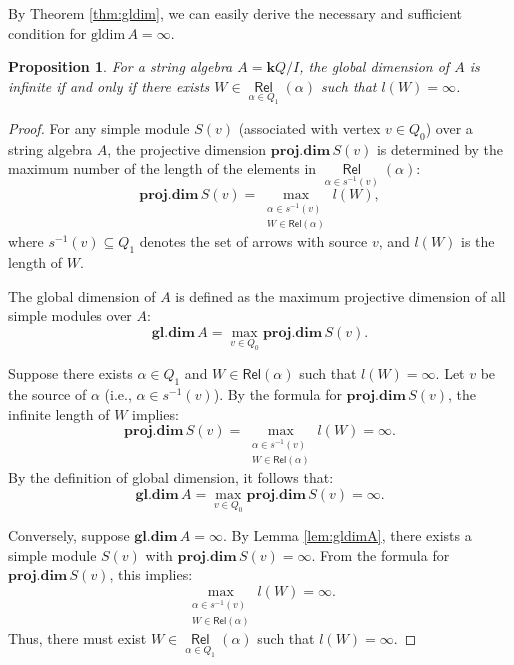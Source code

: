 \documentclass[11pt]{amsart}
\numberwithin{equation}{section}
\newtheorem{proposition}[theorem]{Proposition}
\theoremstyle{definition}
\begin{document}
By Theorem \ref{thm:gldim}, we can easily derive the necessary and sufficient condition for \( \text{gldim}\,A = \infty \).
\begin{proposition}\label{pro:gldim-infinite}
	For a string algebra \( A = \mathbf{k}Q/I \), the global dimension of \( A \) is infinite if and only if there exists \( W \in \mathop{\mathsf{Rel}}\limits_{\alpha \in Q_{1}} (\alpha) \) such that \( l(W) = \infty \).
\end{proposition}
\begin{proof}
	For any simple module \( S(v) \) (associated with vertex \( v \in Q_0 \)) over a string algebra \( A \), the projective dimension \( \textbf{proj.dim}\,S(v) \) is determined by the maximum number of the length of the elements in \( \mathop{\mathsf{Rel}}\limits_{\alpha \in s^{-1}(v)} (\alpha) \):
	\[
	\textbf{proj.dim}\,S(v) = \max\limits_{\substack{\alpha \in s^{-1}(v) \\ W \in \mathsf{Rel}(\alpha)}} l(W),
	\]
	where \( s^{-1}(v) \subseteq Q_1 \) denotes the set of arrows with source \( v \), and \( l(W) \) is the length of \( W \).
	
	
	The global dimension of \( A \) is defined as the maximum projective dimension of all simple modules over \( A \):
	\[
	\textbf{gl.dim}\,A = \max\limits_{v \in Q_0} \textbf{proj.dim}\,S(v).
	\]
	
	
	Suppose there exists \( \alpha \in Q_1 \) and \( W \in \mathsf{Rel}(\alpha) \) such that \( l(W) = \infty \). Let \( v \) be the source of \( \alpha \) (i.e., \( \alpha \in s^{-1}(v) \)). By the formula for \( \textbf{proj.dim}\,S(v) \), the infinite length of \( W \) implies:
	\[
	\textbf{proj.dim}\,S(v) = \max\limits_{\substack{\alpha \in s^{-1}(v) \\ W \in \mathsf{Rel}(\alpha)}} l(W) = \infty.
	\]
	By the definition of global dimension, it follows that:
	\[
	\textbf{gl.dim}\,A = \max\limits_{v \in Q_0} \textbf{proj.dim}\,S(v) = \infty.
	\]
	
	
	Conversely, suppose \( \textbf{gl.dim}\,A = \infty \). By Lemma \ref{lem:gldimA}, there exists a simple module \( S(v) \) with \( \textbf{proj.dim}\,S(v) = \infty \). From the formula for \( \textbf{proj.dim}\,S(v) \), this implies:
	\[
	\max\limits_{\substack{\alpha \in s^{-1}(v) \\ W \in \mathsf{Rel}(\alpha)}} l(W) = \infty.
	\]
	Thus, there must exist  \( W \in \mathop{\mathsf{Rel}}\limits_{\alpha \in Q_{1}}(\alpha) \) such that \( l(W) = \infty \).
\end{proof}
\end{document}
